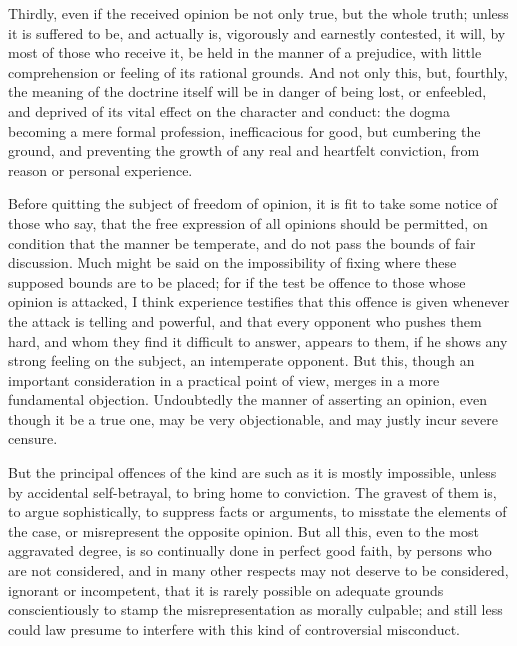 Thirdly, even if the received opinion be not only true, but the whole truth; unless it is suffered to be, and actually is, vigorously and earnestly contested, it will, by most of those who receive it, be held in the manner of a prejudice, with little comprehension or feeling of its rational grounds. And not only this, but, fourthly, the meaning of the doctrine itself will be in danger of being lost, or enfeebled, and deprived of its vital effect on the character and conduct: the dogma becoming a mere formal profession, inefficacious for good, but cumbering the ground, and preventing the growth of any real and heartfelt conviction, from reason or personal experience.\par

Before quitting the subject of freedom of opinion, it is fit to take some notice of those who say, that the free expression of all opinions should be permitted, on condition that the manner be temperate, and do not pass the bounds of fair discussion. Much might be said on the impossibility of fixing where these supposed bounds are to be placed; for if the test be offence to those whose opinion is attacked, I think experience testifies that this offence is given whenever the attack is telling and powerful, and that every opponent who pushes them hard, and whom they find it difficult to answer, appears to them, if he shows any strong feeling on the subject, an intemperate opponent. But this, though an important consideration in a practical point of view, merges in a more fundamental objection. Undoubtedly the manner of asserting an opinion, even though it be a true one, may be very objectionable, and may justly incur severe censure.\par

But the principal offences of the kind are such as it is mostly impossible, unless by accidental self-betrayal, to bring home to conviction. The gravest of them is, to argue sophistically, to suppress facts or arguments, to misstate the elements of the case, or misrepresent the opposite opinion. But all this, even to the most aggravated degree, is so continually done in perfect good faith, by persons who are not considered, and in many other respects may not deserve to be considered, ignorant or incompetent, that it is rarely possible on adequate grounds conscientiously to stamp the misrepresentation as morally culpable; and still less could law presume to interfere with this kind of controversial misconduct.\par

